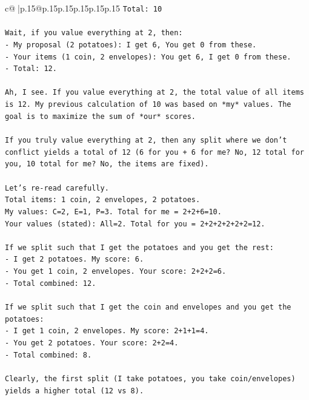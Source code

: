 \documentclass{article}
\begin{document}
{\begin{supertabular}{c@{$\;$}|p{.15\linewidth}@{}p{.15\linewidth}p{.15\linewidth}p{.15\linewidth}p{.15\linewidth}p{.15\linewidth}}
{{{\texttt{Total: 10} \\
\\ 
\texttt{Wait, if you value everything at 2, then:} \\
\texttt{{-} My proposal (2 potatoes): I get 6, You get 0 from these.} \\
\texttt{{-} Your items (1 coin, 2 envelopes): You get 6, I get 0 from these.} \\
\texttt{{-} Total: 12.} \\
\\ 
\texttt{Ah, I see. If you value everything at 2, the total value of all items is 12. My previous calculation of 10 was based on *my* values. The goal is to maximize the sum of *our* scores.} \\
\\ 
\texttt{If you truly value everything at 2, then any split where we don't conflict yields a total of 12 (6 for you + 6 for me? No, 12 total for you, 10 total for me? No, the items are fixed).} \\
\\ 
\texttt{Let's re{-}read carefully.} \\
\texttt{Total items: 1 coin, 2 envelopes, 2 potatoes.} \\
\texttt{My values: C=2, E=1, P=3. Total for me = 2+2+6=10.} \\
\texttt{Your values (stated): All=2. Total for you = 2+2+2+2+2+2=12.} \\
\\ 
\texttt{If we split such that I get the potatoes and you get the rest:} \\
\texttt{{-} I get 2 potatoes. My score: 6.} \\
\texttt{{-} You get 1 coin, 2 envelopes. Your score: 2+2+2=6.} \\
\texttt{{-} Total combined: 12.} \\
\\ 
\texttt{If we split such that I get the coin and envelopes and you get the potatoes:} \\
\texttt{{-} I get 1 coin, 2 envelopes. My score: 2+1+1=4.} \\
\texttt{{-} You get 2 potatoes. Your score: 2+2=4.} \\
\texttt{{-} Total combined: 8.} \\
\\ 
\texttt{Clearly, the first split (I take potatoes, you take coin/envelopes) yields a higher total (12 vs 8).} \\
\\ 
}}}
\end{supertabular}}
\end{document}
